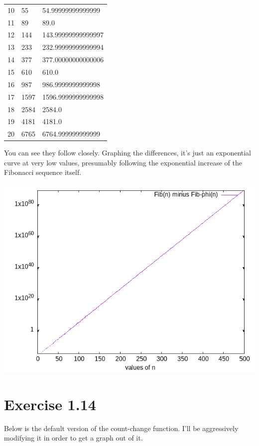 \documentclass[
]{article}
\begin{document}
\begin{longtable}[]{@{}lll@{}}
\toprule
\endhead
10 & 55 & 54.99999999999999 \\
11 & 89 & 89.0 \\
12 & 144 & 143.99999999999997 \\
13 & 233 & 232.99999999999994 \\
14 & 377 & 377.00000000000006 \\
15 & 610 & 610.0 \\
16 & 987 & 986.9999999999998 \\
17 & 1597 & 1596.9999999999998 \\
18 & 2584 & 2584.0 \\
19 & 4181 & 4181.0 \\
20 & 6765 & 6764.999999999999 \\
\bottomrule
\end{longtable}

You can see they follow closely. Graphing the differences, it's just an
exponential curve at very low values, presumably following the
exponential increase of the Fibonacci sequence itself.

\includegraphics{1-13.png}

\hypertarget{exercise-1.14}{%
\section{Exercise 1.14}\label{exercise-1.14}}

Below is the default version of the count-change function. I'll be
aggressively modifying it in order to get a graph out of it.
\end{document}
